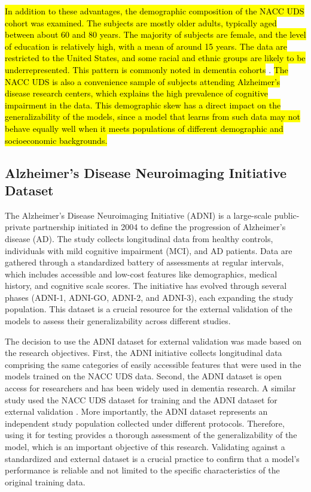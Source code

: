 \hl{In addition to these advantages, the demographic composition of the NACC UDS cohort was examined. The subjects are mostly older adults, typically aged between about 60 and 80 years. The majority of subjects are female, and the level of education is relatively high, with a mean of around 15 years. The data are restricted to the United States, and some racial and ethnic groups are likely to be underrepresented. This pattern is commonly noted in dementia cohorts} \cite{Lennon2021Black, Nianogo2022Risk}. \hl{The NACC UDS is also a convenience sample of subjects attending Alzheimer's disease research centers, which explains the high prevalence of cognitive impairment in the data. This demographic skew has a direct impact on the generalizability of the models, since a model that learns from such data may not behave equally well when it meets populations of different demographic and socioeconomic backgrounds.}

\subsection{Alzheimer's Disease Neuroimaging Initiative Dataset}
The Alzheimer's Disease Neuroimaging Initiative (\acrshort{ADNI}) \cite{Weiner2024Overview} is a large-scale public-private partnership initiated in 2004 to define the progression of Alzheimer's disease (\acrshort{AD}). The study collects longitudinal data from healthy controls, individuals with mild cognitive impairment (\acrshort{MCI}), and AD patients. Data are gathered through a standardized battery of assessments at regular intervals, which includes accessible and low-cost features like demographics, medical history, and cognitive scale scores. The initiative has evolved through several phases (ADNI-1, ADNI-GO, ADNI-2, and ADNI-3), each expanding the study population. This dataset is a crucial resource for the external validation of the models to assess their generalizability across different studies.

The decision to use the ADNI dataset for external validation was made based on the research objectives. First, the ADNI initiative collects longitudinal data comprising the same categories of easily accessible features that were used in the models trained on the NACC UDS data. Second, the ADNI dataset is open access for researchers and has been widely used in dementia research. A similar study used the NACC UDS dataset for training and the ADNI dataset for external validation \cite{abbas2024Explainable}. More importantly, the ADNI dataset represents an independent study population collected under different protocols. Therefore, using it for testing provides a thorough assessment of the generalizability of the model, which is an important objective of this research. Validating against a standardized and external dataset is a crucial practice to confirm that a model's performance is reliable and not limited to the specific characteristics of the original training data.

